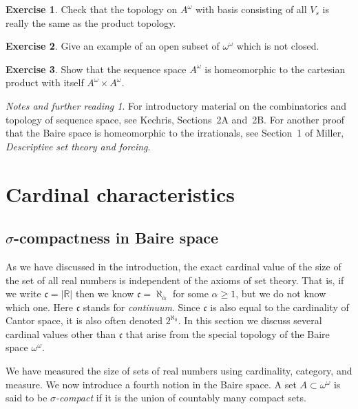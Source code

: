 \documentclass[11pt,oneside]{amsbook}
\newcommand{\RR}{\mathbb R}
\theoremstyle{definition}
\newtheorem{exerc}{Exercise}[section]
\theoremstyle{plain}
\theoremstyle{definition}
\theoremstyle{remark}
\newtheorem*{notes}{Notes and further reading}
\begin{document}
\begin{exerc}
  Check that the topology on $A^\omega$ with basis consisting of all $V_s$ is really the same as the product topology.
\end{exerc}

\begin{exerc}
  Give an example of an open subset of $\omega^\omega$ which is not closed.
\end{exerc}

\begin{exerc}
  Show that the sequence space $A^\omega$ is homeomorphic to the cartesian product with itself $A^\omega\times A^\omega$.
\end{exerc}

\begin{notes}
  For introductory material on the combinatorics and topology of sequence space, see Kechris, Sections~2A and~2B. For another proof that the Baire space is homeomorphic to the irrationals, see Section~1 of Miller, \emph{Descriptive set theory and forcing}.
\end{notes}


\chapter{Cardinal characteristics}

\section{$\sigma$-compactness in Baire space}

As we have discussed in the introduction, the exact cardinal value of the size of the set of all real numbers is independent of the axioms of set theory. That is, if we write $\mathfrak c=|\RR|$ then we know $\mathfrak c=\aleph_\alpha$ for some $\alpha\geq1$, but we do not know which one. Here $\mathfrak c$ stands for \emph{continuum}. Since $\mathfrak c$ is also equal to the cardinality of Cantor space, it is also often denoted $2^{\aleph_0}$. In this section we discuss several cardinal values other than $\mathfrak c$ that arise from the special topology of the Baire space $\omega^\omega$.

We have measured the size of sets of real numbers using cardinality, category, and measure. We now introduce a fourth notion in the Baire space. A set $A\subset\omega^\omega$ is said to be \emph{$\sigma$-compact} if it is the union of countably many compact sets.
\end{document}
